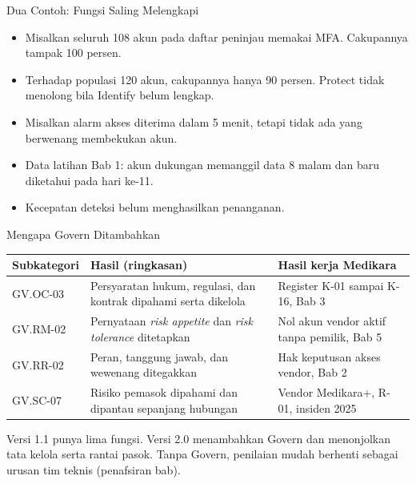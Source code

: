 \documentclass[aspectratio=169, table, 12pt]{beamer}
\begin{document}
\begin{frame}{{\Large Dua Contoh: Fungsi Saling Melengkapi}}
  \vspace{6pt}
  \small
  \begin{itemize}
    \item Misalkan seluruh 108 akun pada daftar peninjau memakai MFA. Cakupannya tampak 100 persen.
    \item Terhadap populasi 120 akun, cakupannya hanya 90 persen. Protect tidak menolong bila
          Identify belum lengkap.
    \item Misalkan alarm akses diterima dalam 5 menit, tetapi tidak ada yang berwenang membekukan
          akun.
    \item Data latihan Bab 1: akun dukungan memanggil data 8 malam dan baru diketahui pada hari ke-11.
    \item Kecepatan deteksi belum menghasilkan penanganan.
  \end{itemize}
\end{frame}

\begin{frame}{{\Large Mengapa Govern Ditambahkan}}
  \vspace{2pt}
  \scriptsize
  \begin{tabularx}{\textwidth}{|>{\raggedright\arraybackslash}p{}|>{\raggedright\arraybackslash}X|>{\raggedright\arraybackslash}X|}
    \hline
    \textbf{Subkategori} & \textbf{Hasil (ringkasan)} & \textbf{Hasil kerja Medikara} \\ \hline
    GV.OC-03 & Persyaratan hukum, regulasi, dan kontrak dipahami serta dikelola & Register K-01
    sampai K-16, Bab 3 \\ \hline
    GV.RM-02 & Pernyataan \textit{risk appetite} dan \textit{risk tolerance} ditetapkan & Nol akun
    vendor aktif tanpa pemilik, Bab 5 \\ \hline
    GV.RR-02 & Peran, tanggung jawab, dan wewenang ditegakkan & Hak keputusan akses vendor, Bab 2 \\
    \hline
    GV.SC-07 & Risiko pemasok dipahami dan dipantau sepanjang hubungan & Vendor Medikara+, R-01,
    insiden 2025 \\ \hline
  \end{tabularx}

  \vspace{8pt}
  \small Versi 1.1 punya lima fungsi. Versi 2.0 menambahkan Govern dan menonjolkan tata kelola serta
  rantai pasok. Tanpa Govern, penilaian mudah berhenti sebagai urusan tim teknis (penafsiran bab).
\end{frame}
\end{document}

